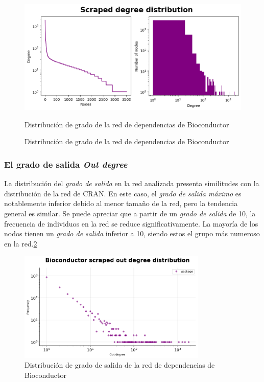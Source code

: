 \begin{figure}[ht!]
    \begin{center}
        \includegraphics[width=1\textwidth]{img/bioconductor/degree_dist.png}
        \caption{Distribución de grado de la red de dependencias de Bioconductor}
        \label{fig:bioconductor_degree_dist}
        \caption{Distribución de grado de la red de dependencias de Bioconductor}
    \end{center}
\end{figure}

\subsubsection{El grado de salida \textit{Out degree}}

La distribución del \emph{grado de salida} en la red analizada presenta similitudes con
la distribución de la red de CRAN. En este caso, el \emph{grado de salida máximo} es
notablemente inferior debido al menor tamaño de la red, pero la tendencia general es
similar. Se puede apreciar que a partir de un \emph{grado de salida} de 10, la frecuencia
de individuos en la red se reduce significativamente. La mayoría de los nodos tienen un
\emph{grado de salida} inferior a 10, siendo estos el grupo más numeroso en la red.\ref{fig:bioconductor_out_degree_dist}

\begin{figure}[ht!]
    \begin{center}
        \includegraphics[width=0.8\textwidth]{img/bioconductor/out_degree_dist.png}
        \caption{Distribución de grado de salida de la red de dependencias de Bioconductor}
        \label{fig:bioconductor_out_degree_dist}
    \end{center}
\end{figure}

